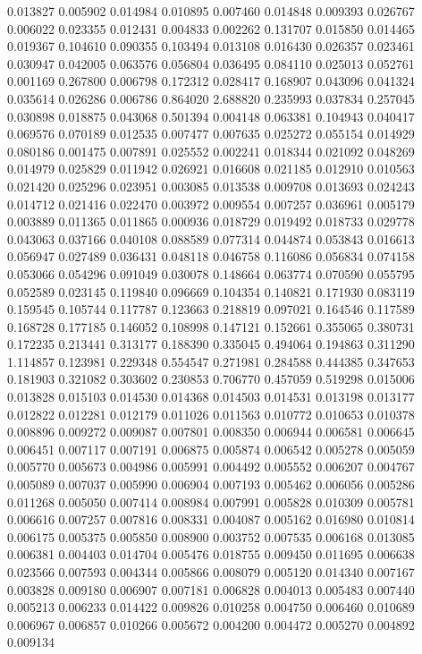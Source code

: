 0.013827
0.005902
0.014984
0.010895
0.007460
0.014848
0.009393
0.026767
0.006022
0.023355
0.012431
0.004833
0.002262
0.131707
0.015850
0.014465
0.019367
0.104610
0.090355
0.103494
0.013108
0.016430
0.026357
0.023461
0.030947
0.042005
0.063576
0.056804
0.036495
0.084110
0.025013
0.052761
0.001169
0.267800
0.006798
0.172312
0.028417
0.168907
0.043096
0.041324
0.035614
0.026286
0.006786
0.864020
2.688820
0.235993
0.037834
0.257045
0.030898
0.018875
0.043068
0.501394
0.004148
0.063381
0.104943
0.040417
0.069576
0.070189
0.012535
0.007477
0.007635
0.025272
0.055154
0.014929
0.080186
0.001475
0.007891
0.025552
0.002241
0.018344
0.021092
0.048269
0.014979
0.025829
0.011942
0.026921
0.016608
0.021185
0.012910
0.010563
0.021420
0.025296
0.023951
0.003085
0.013538
0.009708
0.013693
0.024243
0.014712
0.021416
0.022470
0.003972
0.009554
0.007257
0.036961
0.005179
0.003889
0.011365
0.011865
0.000936
0.018729
0.019492
0.018733
0.029778
0.043063
0.037166
0.040108
0.088589
0.077314
0.044874
0.053843
0.016613
0.056947
0.027489
0.036431
0.048118
0.046758
0.116086
0.056834
0.074158
0.053066
0.054296
0.091049
0.030078
0.148664
0.063774
0.070590
0.055795
0.052589
0.023145
0.119840
0.096669
0.104354
0.140821
0.171930
0.083119
0.159545
0.105744
0.117787
0.123663
0.218819
0.097021
0.164546
0.117589
0.168728
0.177185
0.146052
0.108998
0.147121
0.152661
0.355065
0.380731
0.172235
0.213441
0.313177
0.188390
0.335045
0.494064
0.194863
0.311290
1.114857
0.123981
0.229348
0.554547
0.271981
0.284588
0.444385
0.347653
0.181903
0.321082
0.303602
0.230853
0.706770
0.457059
0.519298
0.015006
0.013828
0.015103
0.014530
0.014368
0.014503
0.014531
0.013198
0.013177
0.012822
0.012281
0.012179
0.011026
0.011563
0.010772
0.010653
0.010378
0.008896
0.009272
0.009087
0.007801
0.008350
0.006944
0.006581
0.006645
0.006451
0.007117
0.007191
0.006875
0.005874
0.006542
0.005278
0.005059
0.005770
0.005673
0.004986
0.005991
0.004492
0.005552
0.006207
0.004767
0.005089
0.007037
0.005990
0.006904
0.007193
0.005462
0.006056
0.005286
0.011268
0.005050
0.007414
0.008984
0.007991
0.005828
0.010309
0.005781
0.006616
0.007257
0.007816
0.008331
0.004087
0.005162
0.016980
0.010814
0.006175
0.005375
0.005850
0.008900
0.003752
0.007535
0.006168
0.013085
0.006381
0.004403
0.014704
0.005476
0.018755
0.009450
0.011695
0.006638
0.023566
0.007593
0.004344
0.005866
0.008079
0.005120
0.014340
0.007167
0.003828
0.009180
0.006907
0.007181
0.006828
0.004013
0.005483
0.007440
0.005213
0.006233
0.014422
0.009826
0.010258
0.004750
0.006460
0.010689
0.006967
0.006857
0.010266
0.005672
0.004200
0.004472
0.005270
0.004892
0.009134
